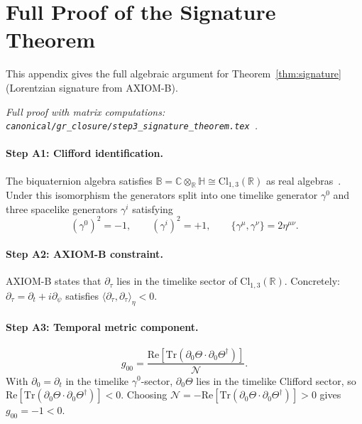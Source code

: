 \documentclass[12pt,a4paper]{article}
\theoremstyle{definition}
\theoremstyle{remark}
\newcommand{\BB}{\mathbb{B}}
\newcommand{\CC}{\mathbb{C}}
\newcommand{\RR}{\mathbb{R}}
\newcommand{\HH}{\mathbb{H}}
\newcommand{\Tr}{\mathrm{Tr}}
\newcommand{\re}{\mathrm{Re}}
\newcommand{\calN}{\mathcal{N}}
\begin{document}
\appendix

\section{Full Proof of the Signature Theorem}
\label{app:signature}

This appendix gives the full algebraic argument for
Theorem~\ref{thm:signature} (Lorentzian signature from AXIOM-B).

\medskip
\noindent\textit{Full proof with matrix computations:
\texttt{canonical/gr\_closure/step3\_signature\_theorem.tex}~\cite{jaros2026_canonical}.}

\paragraph{Step A1: Clifford identification.}
The biquaternion algebra satisfies
$\BB = \CC\otimes_\RR\HH \cong \mathrm{Cl}_{1,3}(\RR)$
as real algebras~\cite{porteous1995}.
Under this isomorphism the generators split into one timelike generator
$\gamma^0$ and three spacelike generators $\gamma^i$ satisfying
\[
  (\gamma^0)^2 = -1, \qquad
  (\gamma^i)^2 = +1, \qquad
  \{\gamma^\mu,\gamma^\nu\} = 2\eta^{\mu\nu}.
\]

\paragraph{Step A2: AXIOM-B constraint.}
AXIOM-B states that $\partial_\tau$ lies in the timelike sector of
$\mathrm{Cl}_{1,3}(\RR)$.
Concretely: $\partial_\tau = \partial_t + i\partial_\psi$ satisfies
$\langle\partial_\tau,\partial_\tau\rangle_\eta < 0$.

\paragraph{Step A3: Temporal metric component.}
\[
  g_{00}
  = \frac{\re[\Tr(\partial_0\Theta \cdot \partial_0\Theta^\dagger)]}{\calN}.
\]
With $\partial_0 = \partial_t$ in the timelike $\gamma^0$-sector,
$\partial_0\Theta$ lies in the timelike Clifford sector, so
$\re[\Tr(\partial_0\Theta \cdot \partial_0\Theta^\dagger)] < 0$.
Choosing $\calN = -\re[\Tr(\partial_0\Theta \cdot \partial_0\Theta^\dagger)] > 0$
gives $g_{00} = -1 < 0$.
\end{document}
